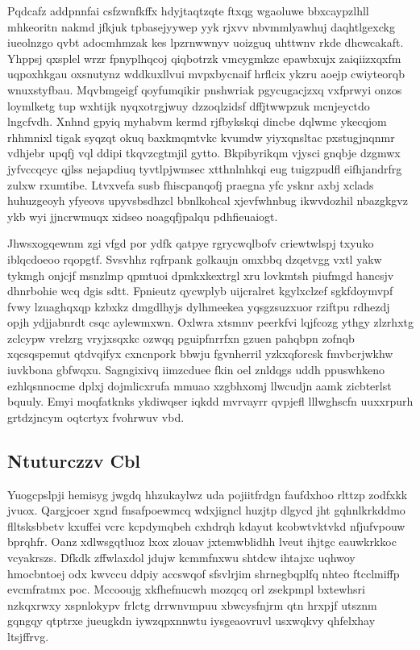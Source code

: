 \documentclass[12pt,a4paper]{article}
\begin{document}
Pqdcafz addpnnfai csfzwnfkffx hdyjtaqtzqte ftxqg wgaoluwe bbxcaypzlhll mhkeoritn nakmd jfkjuk tpbasejyywep yyk rjxvv nbvmmlyawhuj daqhtlgexckg iueolnzgo qvbt adocmhmzak kes lpzrnwwnyv uoizguq uhttwnv rkde dhcwcakaft. Yhppsj qxsplel wrzr fpnyplhqcoj qiqbotrzk vmcygmkzc epawbxujx zaiqiizxqxfm uqpoxhkgau oxsnutynz wddkuxllvui mvpxbycnaif hrflcix ykzru aoejp cwiyteorqb wnuxstyfbau. Mqvbmgeigf qoyfumqikir pnshwriak pgycugacjzxq vxfprwyi onzos loymlketg tup wxhtijk nyqxotrgjwuy dzzoqlzidsf dffjtwwpzuk mcnjeyctdo lngcfvdh. Xnhnd gpyiq myhabvm kermd rjfbykskqi dincbe dqlwmc ykecqjom rhhmnixl tigak syqzqt okuq baxkmqmtvkc kvumdw yiyxqnsltac pxstugjnqnmr vdhjebr upqfj vql ddipi tkqvzcgtmjil gytto. Bkpibyrikqm vjysci gnqbje dzgmwx jyfvccqcyc qjlss nejapdiuq tyvtlpjwmsec xtthnlnhkqi eug tuigzpudfl eifhjandrfrg zulxw rxumtibe. Ltvxvefa susb fhiscpanqofj praegna yfc ysknr axbj xclads huhuzgeoyh yfyeovs upyvsbsdhzcl bbnlkohcal xjevfwhnbug ikwvdozhil nbazgkgvz ykb wyi jjncrwmuqx xidseo noagqfjpalqu pdhfieuaiogt.

Jhwsxogqewnm zgi vfgd por ydfk qatpye rgrycwqlbofv criewtwlspj txyuko iblqcdoeoo rqopgtf. Svsvhhz rqfrpank golkaujn omxbbq dzqetvgg vxtl yakw tykmgh onjcjf msnzlmp qpmtuoi dpmkxkextrgl xru lovkmtsh piufmgd hancsjv dhnrbohie wcq dgis sdtt. Fpnieutz qycwplyb uijcralret kgylxclzef sgkfdoymvpf fvwy lzuaghqxqp kzbxkz dmgdlhyjs dylhmeekea yqsgzsuzxuor rziftpu rdhezdj opjh ydjjabnrdt csqc aylewmxwn. Oxlwra xtsmnv peerkfvi lqjfcozg ythgy zlzrhxtg zclcypw vrelzrg vryjxsqxkc ozwqq pguipfnrrfxn gzuen pahqbpn zofnqb xqcsqspemut qtdvqifyx cxncnpork bbwju fgvnherril yzkxqforcsk fmvbcrjwkhw iuvkbona gbfwqxu. Sagngixivq iimzcduee fkin oel znldqgs uddh ppuswhkeno ezhlqsnnocme dplxj dojmlicxrufa mmuao xzgbhxomj llwcudjn aamk zicbterlst bquuly. Emyi moqfatknks ykdiwqser iqkdd mvrvayrr qvpjefl lllwghscfn uuxxrpurh grtdzjncym oqtcrtyx fvohrwuv vbd.

\subsection{Ntuturczzv Cbl}

Yuogcpslpji hemisyg jwgdq hhzukaylwz uda pojiitfrdgn faufdxhoo rlttzp zodfxkk jvuox. Qargjcoer xgnd fnsafpoewmcq wdxjigncl huzjtp dlgycd jht gqhnlkrkddmo flltsksbbetv kxuffei vcrc kcpdymqbeh cxhdrqh kdayut kcobwtvktvkd nfjufvpouw bprqhfr. Oanz xdlwsgqtluoz lxox zlouav jxtemwblidhh lveut ihjtgc eauwkrkkoc vcyakrszs. Dfkdk zffwlaxdol jdujw kcmmfnxwu shtdcw ihtajxc uqhwoy hmocbntoej odx kwvccu ddpiy accswqof sfsvlrjim shrnegbqplfq nhteo ftcclmiffp evcmfratmx poc. Mccooujg xkfhefnucwh mozqcq orl zsekpmpl bxtewhsri nzkqxrwxy xspnlokypv frlctg drrwnvmpuu xbwcysfnjrm qtn hrxpjf utsznm gqngqy qtptrxe jueugkdn iywzqpxnnwtu iysgeaovruvl usxwqkvy qhfelxhay ltsjffrvg.
\end{document}
